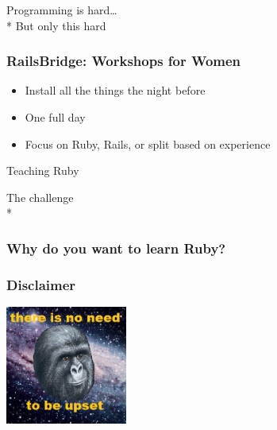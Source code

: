 \documentclass[20pt,aspectratio=169]{beamer}
\begin{document}
\begin{frame}
\par{}Programming is hard\ldots\\*
\vspace{2cm}
But only this hard
\end{frame}

\begin{frame}
\frametitle{RailsBridge: Workshops for Women}
\begin{itemize}
\item Install all the things the night before
\item One full day
\item Focus on Ruby, Rails, or split based on experience
\end{itemize}
\end{frame}

{
\begin{frame}
\par { Teaching Ruby}\par
\vspace{3cm}\hfill
{The challenge \\*}
\end{frame}
}

\begin{frame}
\frametitle{Why do you want to learn Ruby?}
\begin{itemize}
\end{itemize}
\end{frame}

\begin{frame}
\frametitle{Disclaimer}
\centering \includegraphics[width=4cm]{gorilla}\par
{
}
\end{frame}
\end{document}
